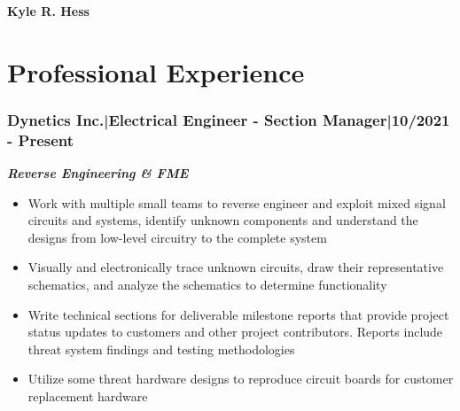 \documentclass[]{article}
\begin{document}
\begin{singlespace}
\noindent\textbf{\huge{Kyle R. Hess}}
\hfill \break
\noindent\makebox[\linewidth]{\rule{\textwidth}{1pt}}
    \vspace{-8mm}

\section*{Professional Experience}

\subsubsection*{Dynetics Inc.\hspace{3 mm}|\hspace{3 mm}Electrical Engineer - Section Manager\hspace{3 mm}|\hspace{3 mm}10/2021 - Present}

\noindent\textbf{\emph{Reverse Engineering \& FME}}    
\begin{itemize}
    \setlength\itemsep{0em}
    \item Work with multiple small teams to reverse engineer and exploit mixed signal circuits and systems, 
    identify unknown components and understand the designs from low-level circuitry to the complete system
    \item Visually and electronically trace unknown circuits, draw their representative schematics, and analyze 
    the schematics to determine functionality
    \item Write technical sections for deliverable milestone reports that provide project status updates to customers 
    and other project contributors. Reports include threat system findings and testing methodologies
    \item Utilize some threat hardware designs to reproduce circuit boards for customer replacement hardware 
\end{itemize}


\end{singlespace}
\end{document}

